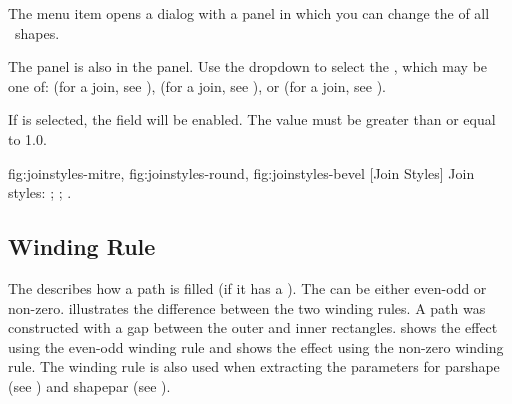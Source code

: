 The  menu item opens a dialog
with a  panel in which
you can change the  
of all \selected\ \glspl{shape}.


The  panel is also in the 
 panel. Use the \gls{dropdown} to select the
, which may be one of:
(for a  join, see
),
(for a  join, see
), or
(for a  join, see
).


If  is selected, the 
field will be enabled. The value must be greater than or equal to
1.0.

{
   {fig:joinstyles-mitre}{}{},
   {fig:joinstyles-round}{}{},
   {fig:joinstyles-bevel}{}{}
}
[Join Styles]
{Join styles:
 ;
 ;
 .}

\subsection{Winding Rule}\label{sec:winding}

The  describes how a \gls{path} is
filled (if it has a ). The
 can be either
even-odd or non-zero.  illustrates the
difference between the two winding rules. A \gls*{path} was constructed
with a \gls{gap} between the outer and inner rectangles.
 shows the effect using the even-odd
winding rule and  shows the effect
using the non-zero winding rule. The winding rule is also used when
extracting the parameters for
\gls{parshape} (see ) and
\gls{shapepar} (see ).

